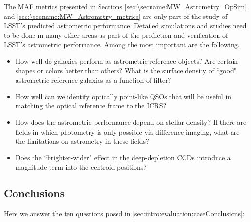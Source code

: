 The MAF metrics presented in Sections \ref{sec:\secname:MW_Astrometry_OpSim} and \ref{sec:\secname:MW_Astrometry_metrics} are only part of the
study of LSST's predicted astrometric performance.  Detailed simulations
and studies need to be done in many other areas as part of the
prediction and verification of LSST's astrometric performance.  Among
the most important are the following.
\begin{itemize}
\item How well do galaxies perform as astrometric reference objects? Are certain shapes or colors better than others? What is the
surface density of ``good" astrometric reference galaxies as a function of filter?
\item How well can we identify optically point-like QSOs that will be useful in matching the optical reference frame to the ICRS?
\item How does the astrometric performance depend on stellar density? If there are fields in which photometry is only possible via difference imaging, what are the limitations
on astrometry in these fields?
\item Does the ``brighter-wider" effect in the deep-depletion CCDs introduce a magnitude term into the centroid positions?
\end{itemize}


\subsection{Conclusions}

Here we answer the ten questions posed in
\autoref{sec:intro:evaluation:caseConclusions}:

